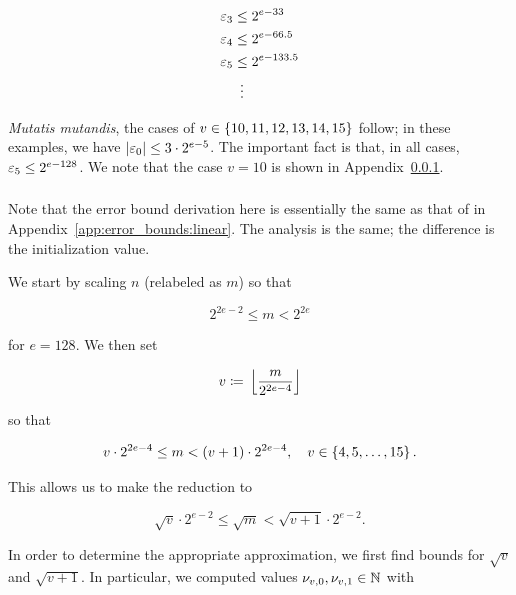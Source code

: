 \begin{itemize}
\begin{align}
    \varepsilon_{3} &\le 2^{e-33} \nonumber\\
    \varepsilon_{4} &\le 2^{e-66.5} \nonumber\\
    \varepsilon_{5} &\le 2^{e-133.5} \nonumber\\
        &\ \vdots
\end{align}

\emph{Mutatis mutandis},
the cases of $v\in\left\{ 10, 11, 12, 13, 14, 15 \right\}$ follow;
in these examples, we have $\left| \varepsilon_{0} \right| \le 3\cdot2^{e-5}$.
The important fact is that, in all cases, $\varepsilon_{5}\le 2^{e-128}$.
We note that the case $v=10$ is shown in
Appendix~\ref{app:error_bounds:hyper4}.
\end{itemize}


\subsubsection{\HyperFour{}}
\label{app:error_bounds:hyper4}

Note that the error bound derivation here is essentially
the same as that of \Linear{} in Appendix~\ref{app:error_bounds:linear}.
The analysis is the same; the difference is the initialization value.

We start by scaling $n$ (relabeled as $m$) so that

\begin{equation}
    2^{2e-2} \le m < 2^{2e}
\end{equation}

\noindent
for $e = 128$.
We then set

\begin{equation}
    v \coloneqq{} \left\lfloor \frac{m}{2^{2e-4}} \right\rfloor
\end{equation}

\noindent
so that

\begin{equation}
    v\cdot2^{2e-4} \le m < \left( v+1 \right)\cdot2^{2e-4},
    \quad v\in\left\{ 4, 5, \dots, 15 \right\}.
\end{equation}

\noindent
This allows us to make the reduction to

\begin{equation}
    \sqrt{v}\cdot2^{e-2} \le \sqrt{m} < \sqrt{v+1}\cdot2^{e-2}.
    \label{eq:app_hyper4_m_bound}
\end{equation}

In order to determine the appropriate approximation,
we first find bounds for $\sqrt{v}$ and $\sqrt{v+1}$.
In particular, we computed values $\nu_{v,0}, \nu_{v,1}\in\mathbb{N}$ with

